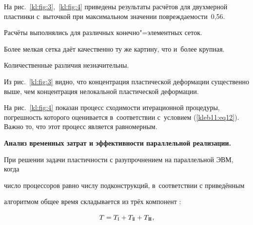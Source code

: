 На рис.~\ref{kl:fig:3},~\ref{kl:fig:4} приведены результаты расчётов для двухмерной пластинки с~выточкой при максимальном значении повреждаемости~0,56.

Расчёты выполнялись для различных конечно"=элементных сеток. 

Более мелкая сетка даёт качественно ту же картину, что и~более крупная. 

Количественные различия незначительны. 

Из рис.~\ref{kl:fig:3} видно, что концентрация пластической деформации существенно выше, чем концентрация нелокальной пластической деформации. 

На рис.~\ref{kl:fig:4} показан процесс сходимости итерационной процедуры, погрешность которого оценивается в~соответствии с~условием (\ref{kleb11:eq12}). Важно то, что этот процесс является равномерным.












\textbf{Анализ временных затрат и эффективности параллельной реализации.}

При решении задачи пластичности с разупрочнением на параллельной ЭВМ, когда

число процессоров равно числу подконструкций, в~соответствии с приведённым

алгоритмом общее время складывается из трёх компонент \cite{kleb11:bib15}:

\begin{equation}

\label{kleb11:eq15} T = T_\text{\sc I} + T_\text{\sc I\!I} + T_\text{\sc I\!I\!I},

\end{equation}

